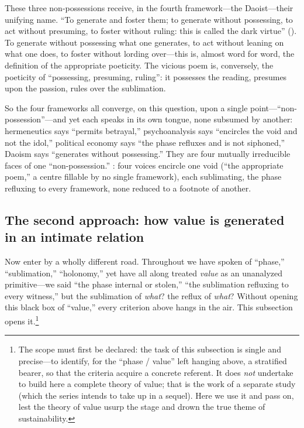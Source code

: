 These three non-possessions receive, in the fourth framework---the Daoist---their unifying name. ``To generate and foster them; to generate without possessing, to act without presuming, to foster without ruling: this is called the dark virtue'' (). To generate without possessing what one generates, to act without leaning on what one does, to foster without lording over---this is, almost word for word, the definition of the appropriate poeticity. The vicious poem is, conversely, the poeticity of ``possessing, presuming, ruling'': it possesses the reading, presumes upon the passion, rules over the sublimation.

So the four frameworks all converge, on this question, upon a single point---``non-possession''---and yet each speaks in its own tongue, none subsumed by another: hermeneutics says ``permits betrayal,'' psychoanalysis says ``encircles the void and not the idol,'' political economy says ``the phase refluxes and is not siphoned,'' Daoism says ``generates without possessing.'' They are four mutually irreducible faces of one ``non-possession.'' : four voices encircle one void (``the appropriate poem,'' a centre fillable by no single framework), each sublimating, the phase refluxing to every framework, none reduced to a footnote of another.

\subsection{The second approach: how value is generated in an intimate relation}
\label{p09:sec:value}

Now enter by a wholly different road. Throughout we have spoken of ``phase,'' ``sublimation,'' ``holonomy,'' yet have all along treated \emph{value} as an unanalyzed primitive---we said ``the phase internal or stolen,'' ``the sublimation refluxing to every witness,'' but the sublimation of \emph{what}? the reflux of \emph{what}? Without opening this black box of ``value,'' every criterion above hangs in the air. This subsection opens it.\footnote{The scope must first be declared: the task of this subsection is single and precise---to identify, for the ``phase / value'' left hanging above, a stratified bearer, so that the criteria acquire a concrete referent. It does \emph{not} undertake to build here a complete theory of value; that is the work of a separate study (which the series intends to take up in a sequel). Here we use it and pass on, lest the theory of value usurp the stage and drown the true theme of sustainability.}

